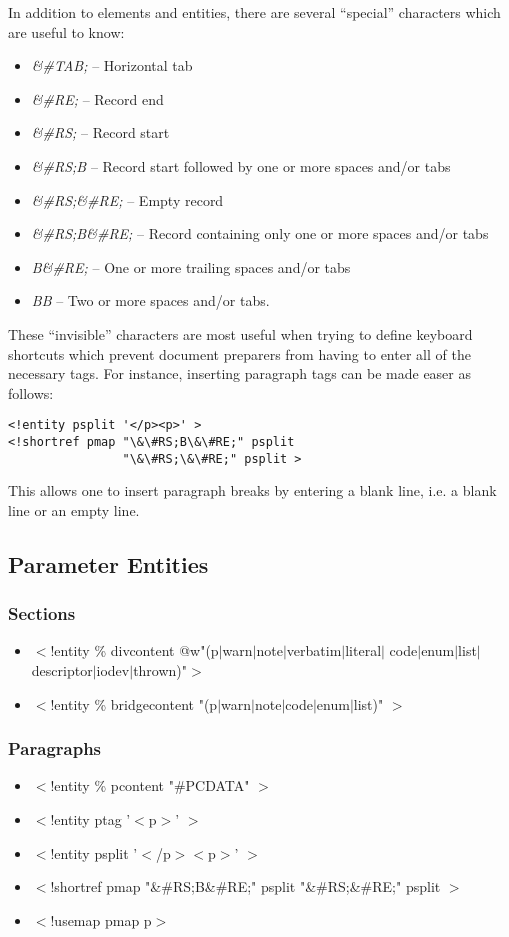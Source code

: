 In addition to elements and entities, there are several ``special'' 
characters which are useful to know:
\begin{itemize}
\item
\textit{\&\#TAB;} -- Horizontal tab
\item
\textit{\&\#RE;} -- Record end
\item
\textit{\&\#RS;} -- Record start
\item
\textit{\&\#RS;B} -- Record start followed by one or more spaces and/or tabs
\item
\textit{\&\#RS;\&\#RE;} -- Empty record
\item
\textit{\&\#RS;B\&\#RE;} -- Record containing only one or more spaces and/or tabs
\item
\textit{B\&\#RE;} -- One or more trailing spaces and/or tabs
\item
\textit{BB} -- Two or more spaces and/or tabs.
\end{itemize}
\noindent
These ``invisible'' characters are most useful when trying to define
keyboard shortcuts which prevent document preparers from having to enter
all of the necessary tags. For instance, inserting paragraph tags can be
made easer as follows:
\begin{verbatim}
<!entity psplit '</p><p>' >
<!shortref pmap "\&\#RS;B\&\#RE;" psplit 
                "\&\#RS;\&\#RE;" psplit >
\end{verbatim}
\noindent
This allows one to insert paragraph breaks by entering a blank
line, i.e. a blank line or an empty line.

\subsection{Parameter Entities}
\subsubsection{Sections}
\begin{itemize}
\item
$<$!entity \% divcontent @w{"(p$|$warn$|$note$|$verbatim$|$literal$|$ code$|$enum$|$list$|$descriptor$|$iodev$|$thrown)"}$>$
\item
$<$!entity \% bridgecontent "(p$|$warn$|$note$|$code$|$enum$|$list)" $>$
\end{itemize}
\subsubsection{Paragraphs}
\begin{itemize}
\item
$<$!entity \% pcontent "\#PCDATA" $>$
\item
$<$!entity ptag '$<$p$>$' $>$
\item
$<$!entity psplit '$<$/p$>$$<$p$>$' $>$
\item
$<$!shortref pmap "\&\#RS;B\&\#RE;" psplit "\&\#RS;\&\#RE;" psplit $>$
\item
$<$!usemap pmap p$>$
\end{itemize}
